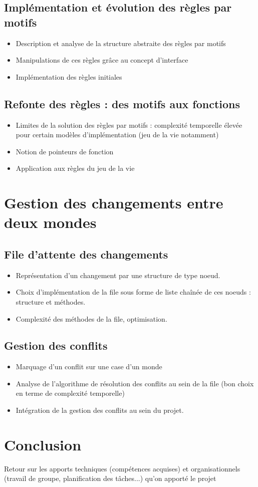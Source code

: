 \subsection{Implémentation et évolution des règles par motifs}
\begin{itemize}
\item Description et analyse de la structure abstraite des règles par motifs
\item Manipulations de ces règles grâce au concept d'interface
\item Implémentation des règles initiales 
\end{itemize}
\subsection{Refonte des règles : des motifs aux fonctions}
\begin{itemize}
\item Limites de la solution des règles par motifs : complexité temporelle élevée pour certain modèles d'implémentation (jeu de la vie notamment)
\item Notion de pointeurs de fonction
\item Application aux règles du jeu de la vie
\end{itemize}

\section{Gestion des changements entre deux mondes}
\subsection{File d'attente des changements}
\begin{itemize}
\item Représentation d'un changement par une structure de type noeud.
\item Choix d'implémentation de la file sous forme de liste chaînée de ces noeuds : structure et méthodes.
\item Complexité des méthodes de la file, optimisation.
\end{itemize}
\subsection{Gestion des conflits}
\begin{itemize}
\item Marquage d'un conflit sur une case d'un monde
\item Analyse de l'algorithme de résolution des conflits au sein de la file (bon choix en terme de complexité temporelle)
\item Intégration de la gestion des conflits au sein du projet.
\end{itemize}
\section{Conclusion}
Retour sur les apports techniques (compétences acquises) et organisationnels (travail de groupe, planification des tâches...) qu'on apporté le projet

